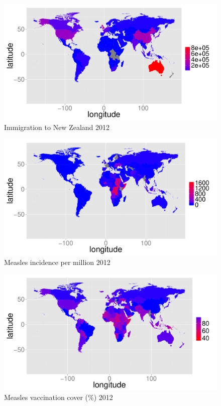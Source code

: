 \documentclass{article}
\begin{document}
\begin{figure}[h!]
\begin{center}
\includegraphics{interimreport1-007}
\end{center}
\caption{Immigration to New Zealand 2012}
\label{fig:immigration12}
\end{figure}

\begin{figure}[h!]
\begin{center}
\includegraphics{interimreport1-008}
\end{center}
\caption{Measles incidence per million 2012}
\label{fig:incidence12}
\end{figure}

\begin{figure}[h!]
\begin{center}
\includegraphics{interimreport1-009}
\end{center}
\caption{Measles vaccination cover (\%) 2012 }
\label{fig:cover12}
\end{figure}
\end{document}
